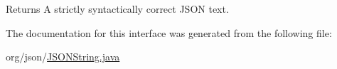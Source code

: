 \begin{DoxyReturn}{Returns}
A strictly syntactically correct J\-S\-O\-N text. 
\end{DoxyReturn}


The documentation for this interface was generated from the following file\-:\begin{DoxyCompactItemize}
\item 
org/json/\hyperlink{_j_s_o_n_string_8java}{J\-S\-O\-N\-String.\-java}\end{DoxyCompactItemize}
